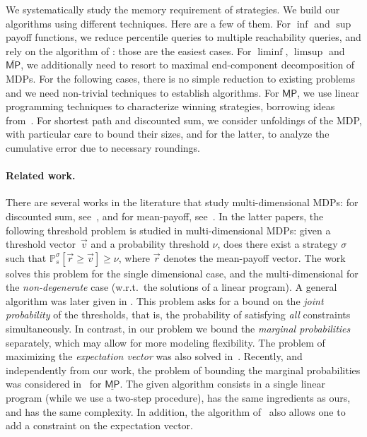 \documentclass{llncs}
\newcommand*{\pr}{\mathbb{P}}
\newcommand*{\mpsup}{\ensuremath{\overline{\mathsf{MP}}}}
\newcommand*{\mpinf}{\ensuremath{\underline{\mathsf{MP}}}}
\begin{document}
We systematically study the memory requirement of strategies. We build our
algorithms using different techniques. Here are a few of them. For $\inf$ and
$\sup$ payoff functions, we reduce percentile queries to multiple reachability
queries, and rely on the algorithm of \cite{EKVY-lmcs08}: those are the
easiest cases. For $\liminf$, $\limsup$ and $\mpsup$, we additionally need to
resort to maximal end-component decomposition of MDPs. For the following cases,
there is no simple reduction to existing problems and we need non-trivial
techniques to establish algorithms.
For $\mpinf$, we use linear programming techniques to characterize winning strategies, borrowing ideas from~\cite{EKVY-lmcs08,BBCFK-lmcs14}. For shortest path and discounted sum, we consider unfoldings of the MDP, with particular care to bound their sizes, and for the latter, to analyze the cumulative error due to necessary roundings.

\paragraph{{\bf Related work.}}
There are several works in the literature that study multi-dimensional MDPs: for discounted sum, see~\cite{CMH-stacs06}, and for mean-payoff, see~\cite{BBCFK-lmcs14,FKR-ieee95}.
In the latter papers, 
the following threshold problem is studied in multi-dimensional MDPs: given a threshold vector~$\vec{v}$ and a probability threshold $\nu$, does there exist a strategy $\sigma$ such that $\pr_s^\sigma[\vec{r} \geq \vec{v}] \geq \nu$, where $\vec{r}$ denotes the mean-payoff vector.
The work~\cite{FKR-ieee95} solves this problem for the single dimensional case, and the multi-dimensional for the \emph{non-degenerate} case (w.r.t.~the solutions of a linear program). 
A general algorithm was later given in \cite{BBCFK-lmcs14}.
This problem asks for a bound on the \emph{joint probability} of the thresholds, that is, the probability of satisfying \emph{all} constraints simultaneously. In contrast,
in our problem we bound the \emph{marginal probabilities} separately, which may allow for more modeling flexibility.
The problem of maximizing the \emph{expectation vector} was also solved in~\cite{BBCFK-lmcs14}. Recently, and independently from our work, the problem of bounding the marginal probabilities was considered in~\cite{CKK-lics15} for $\mpinf$.
The given algorithm consists in a single linear program
(while we use a two-step procedure), has the same ingredients as ours, and has the same complexity. In addition, the algorithm of~\cite{CKK-lics15} also allows one to add
a constraint on the expectation vector.
\end{document}
